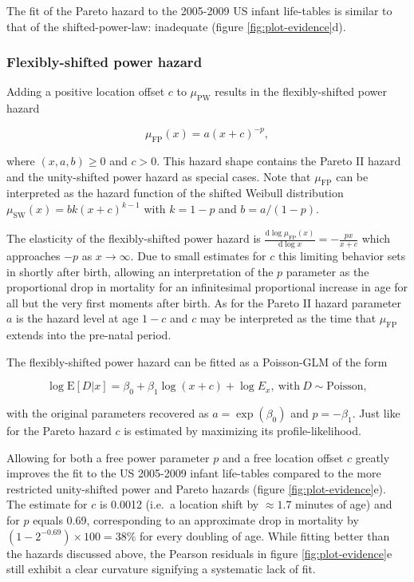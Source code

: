 \documentclass[smallextended]{svjour3} %
\begin{document}
The fit of the Pareto hazard to the 2005-2009 US infant life-tables is
similar to that of the shifted-power-law: inadequate (figure
\ref{fig:plot-evidence}d).

\subsubsection*{Flexibly-shifted power
hazard}\label{flexibly-shifted-power-hazard}

Adding a positive location offset \(c\) to \(\mu_\text{PW}\) results in
the flexibly-shifted power hazard

\[
\mu_\text{FP}(x) = a(x+c)^{-p},
\]

where \((x,a,b)\geq 0\) and \(c > 0\). This hazard shape contains the
Pareto II hazard and the unity-shifted power hazard as special cases.
Note that \(\mu_\text{FP}\) can be interpreted as the hazard function of
the shifted Weibull distribution \(\mu_\text{SW}(x)=bk(x+c)^{k-1}\) with
\(k=1-p\) and \(b=a/(1-p)\).

The elasticity of the flexibly-shifted power hazard is
\(\frac{\text{d}\log\mu_\text{FP}(x)}{\text{d}\log x}=-\frac{px}{x+c}\)
which approaches \(-p\) as \(x\rightarrow\infty\). Due to small
estimates for \(c\) this limiting behavior sets in shortly after birth,
allowing an interpretation of the \(p\) parameter as the proportional
drop in mortality for an infinitesimal proportional increase in age for
all but the very first moments after birth. As for the Pareto II hazard
parameter \(a\) is the hazard level at age \(1-c\) and \(c\) may be
interpreted as the time that \(\mu_\text{FP}\) extends into the
pre-natal period.

The flexibly-shifted power hazard can be fitted as a Poisson-GLM of the
form

\[
\log\text{E}[D|x] = \beta_0 + \beta_1\log(x+c) + \log E_x,~\text{with}~D\sim\text{Poisson},
\]

with the original parameters recovered as \(a = \exp(\beta_0)\) and
\(p = -\beta_1\). Just like for the Pareto hazard \(c\) is estimated by
maximizing its profile-likelihood.

Allowing for both a free power parameter \(p\) and a free location
offset \(c\) greatly improves the fit to the US 2005-2009 infant
life-tables compared to the more restricted unity-shifted power and
Pareto hazards (figure \ref{fig:plot-evidence}e). The estimate for \(c\)
is 0.0012 (i.e.~a location shift by \(\approx1.7\) minutes of age) and
for \(p\) equals 0.69, corresponding to an approximate drop in mortality
by \((1-2^{-0.69})\times100=38 \%\) for every doubling of age. While
fitting better than the hazards discussed above, the Pearson residuals
in figure \ref{fig:plot-evidence}e still exhibit a clear curvature
signifying a systematic lack of fit.
\end{document}
